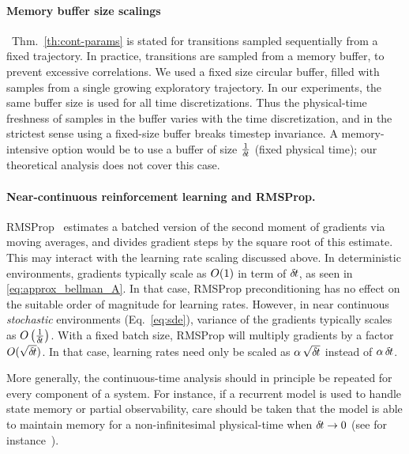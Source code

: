 \paragraph{Memory buffer size scalings}~Thm.~\ref{th:cont-params} is stated for
transitions sampled sequentially from a fixed trajectory. In practice,
transitions are sampled from a memory buffer, to prevent excessive correlations.
We used a fixed size circular buffer, filled
with samples from a single growing exploratory trajectory. In
our experiments, the same buffer size is used for all time discretizations. 
Thus the physical-time freshness of samples in the buffer varies with the
time discretization, and in the strictest sense using a fixed-size buffer
breaks timestep invariance. A memory-intensive option would be to use a
buffer of size $\frac{1}{{\delta\hspace{-.1em}t}}$ (fixed physical time); our theoretical
analysis does not cover this case.

\paragraph{Near-continuous reinforcement learning and RMSProp.} RMSProp~\cite{rmsprop}
estimates a batched version of the second moment of gradients via moving
averages, and divides gradient steps by the square root of this estimate.
This may interact with the learning rate scaling discussed above. In
deterministic environments, gradients typically scale as $O(1)$ in
term of ${\delta\hspace{-.1em}t}$, as seen in \eqref{eq:approx_bellman_A}.  In that case, RMSProp
preconditioning has no effect on the suitable order of magnitude for learning
rates. However, in near continuous \emph{stochastic} environments (Eq.~\ref{eq:sde}), variance of the gradients typically scales as
$O\left(\frac{1}{{\delta\hspace{-.1em}t}}\right)$. With a fixed batch size,
RMSProp will multiply gradients by a factor $O(\sqrt{{\delta\hspace{-.1em}t}})$. In
that case,
learning rates need only be scaled as $\alpha \,\sqrt{{\delta\hspace{-.1em}t}}$ instead of
$\alpha \,{\delta\hspace{-.1em}t}$.

More generally, the continuous-time analysis should in principle be repeated for every component of  
a system. For instance, if a recurrent model is used to handle state memory or partial observability, care should be taken that the model is able to maintain memory for a non-infinitesimal physical-time when ${\delta\hspace{-.1em}t}\to 0$ (see for instance~\citealt{chronornn}).
